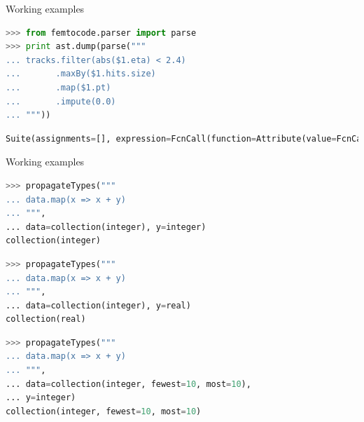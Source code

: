 \documentclass{beamer}
\begin{document}

\begin{frame}[fragile]{Working examples}
\vspace{0.3 cm}
\begin{lstlisting}[language=python]
>>> from femtocode.parser import parse
>>> print ast.dump(parse("""
... tracks.filter(abs($1.eta) < 2.4)
...       .maxBy($1.hits.size)
...       .map($1.pt)
...       .impute(0.0)
... """))
\end{lstlisting}
\begin{lstlisting}[language=python,basicstyle=\ttfamily\scriptsize]
Suite(assignments=[], expression=FcnCall(function=Attribute(value=FcnCall(function=Attribute(value=FcnCall(function=Attribute(value=FcnCall(function=Attribute(value=Name(id='tracks', ctx=Load()), attr='filter', ctx=Load()), positional=[Compare(left=FcnCall(function=Name(id='abs', ctx=Load()), positional=[Attribute(value=AtArg(num=1), attr='eta', ctx=Load())], names=[], named=[]), ops=[Lt()], comparators=[Num(n=2.4)])], names=[], named=[]), attr='maxBy', ctx=Load()), positional=[Attribute(value=Attribute(value=AtArg(num=1), attr='hits', ctx=Load()), attr='size', ctx=Load())], names=[], named=[]), attr='map', ctx=Load()), positional=[Attribute(value=AtArg(num=1), attr='pt', ctx=Load())], names=[], named=[]), attr='impute', ctx=Load()), positional=[Num(n=0.0)], names=[], named=[]))
\end{lstlisting}
\end{frame}

\begin{frame}[fragile]{Working examples}
\vspace{0.3 cm}
\begin{lstlisting}[language=python]
>>> propagateTypes("""
... data.map(x => x + y)
... """,
... data=collection(integer), y=integer)
collection(integer)
\end{lstlisting}

\begin{lstlisting}[language=python]
>>> propagateTypes("""
... data.map(x => x + y)
... """,
... data=collection(integer), y=real)
collection(real)
\end{lstlisting}

\begin{lstlisting}[language=python]
>>> propagateTypes("""
... data.map(x => x + y)
... """,
... data=collection(integer, fewest=10, most=10),
... y=integer)
collection(integer, fewest=10, most=10)
\end{lstlisting}
\end{frame}
\end{document}
